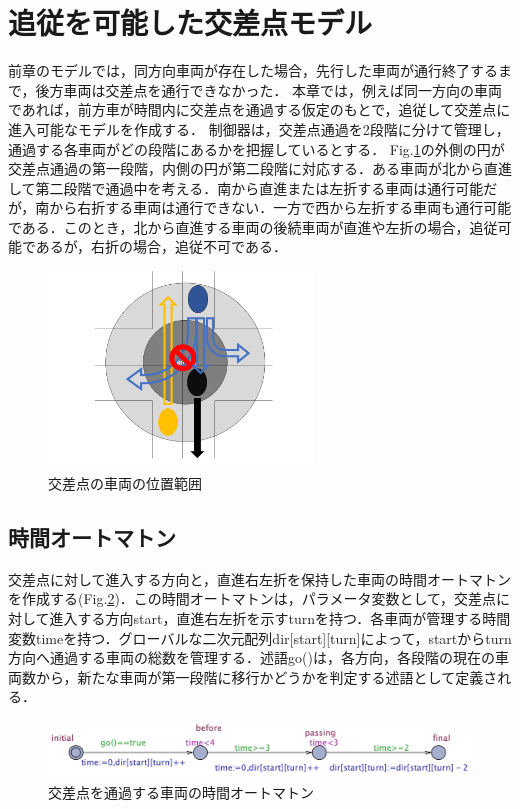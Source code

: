 \documentclass{jarticle}
\begin{document}
\section{追従を可能した交差点モデル}
前章のモデルでは，同方向車両が存在した場合，先行した車両が通行終了するまで，後方車両は交差点を通行できなかった．
本章では，例えば同一方向の車両であれば，前方車が時間内に交差点を通過する仮定のもとで，追従して交差点に進入可能なモデルを作成する．
制御器は，交差点通過を2段階に分けて管理し，通過する各車両がどの段階にあるかを把握しているとする．
Fig.\ref{map}の外側の円が交差点通過の第一段階，内側の円が第二段階に対応する．ある車両が北から直進して第二段階で通過中を考える．南から直進または左折する車両は通行可能だが，南から右折する車両は通行できない．一方で西から左折する車両も通行可能である．このとき，北から直進する車両の後続車両が直進や左折の場合，追従可能であるが，右折の場合，追従不可である．
	\begin{figure}[htbp]
	\centering
	\includegraphics[width=70mm]{model.png}
	\caption{交差点の車両の位置範囲}
	\label{map}
	\end{figure}

\subsection{時間オートマトン}
交差点に対して進入する方向と，直進右左折を保持した車両の時間オートマトンを作成する(Fig.\ref{TAuto})．この時間オートマトンは，パラメータ変数として，交差点に対して進入する方向start，直進右左折を示すturnを持つ．各車両が管理する時間変数timeを持つ．グローバルな二次元配列dir[start][turn]によって，startからturn方向へ通過する車両の総数を管理する．述語go()は，各方向，各段階の現在の車両数から，新たな車両が第一段階に移行かどうかを判定する述語として定義される．
	\begin{figure}[htbp]
	\centering
	\includegraphics[width=130mm]{TAuto.png}
	\caption{交差点を通過する車両の時間オートマトン}
	\label{TAuto}
	\end{figure}
\end{document}
